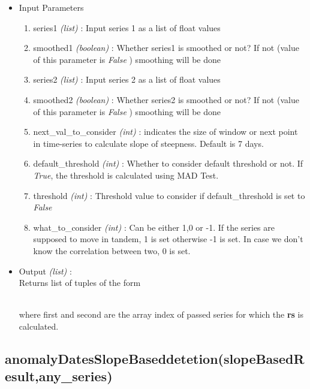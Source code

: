 
\begin{itemize}
 \item Input Parameters
 
 \begin{enumerate}
  \item series1 \textit{(list)} : Input series 1 as a list of float values
  \item smoothed1 \textit{(boolean)} : Whether series1 is smoothed or not? If not (value of this parameter is \textit{False} ) smoothing will be done
  \item series2 \textit{(list)} : Input series 2 as a list of float values
  \item smoothed2 \textit{(boolean)} : Whether series2 is smoothed or not? If not (value of this parameter is \textit{False} ) smoothing will be done
  \item next{\_}val{\_}to{\_}consider \textit{(int)} : indicates the size of window or next point in time-series to calculate slope of steepness. Default is 7 days.
  \item default{\_}threshold \textit{(int)} : Whether to consider default threshold or not. If \textit{True}, the threshold is calculated using MAD Test.
  \item threshold \textit{(int)} : Threshold value to consider if default\_threshold is set to \textit{False}
  \item what{\_}to{\_}consider \textit{(int)} : Can be either 1,0 or -1. If the series are supposed to move in tandem, 1 is set otherwise -1 is set. In case we don't know the correlation between two, 0 is set.
  \end{enumerate}

 \item Output \textit{(list)} : \\
  Returns list of tuples of the form \\
  \\
  \begin{flushleft}
 where first and second are the array index of passed series for which the \textbf{rs} is calculated.
 \end{flushleft}
\end{itemize}

\subsection{anomalyDatesSlopeBaseddetetion(slopeBasedResult,any\_series)}

